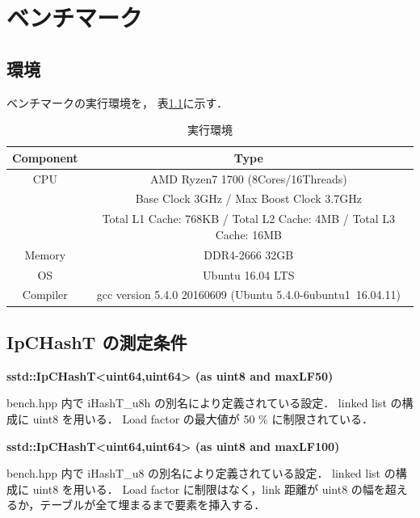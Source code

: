 \chapter{ベンチマーク}
\label{chap_Results}

\section{環境}

ベンチマークの実行環境を，
表\ref{table_env}に示す．

\begin{table}[hbtp]
  \label{table_env}
  \begin{center}
    \caption{実行環境}
    \begin{tabular}{cc} \hline
      Component & Type \rule[0pt]{0pt}{0pt} \\ \hline
      CPU & AMD Ryzen7 1700 (8Cores/16Threads) \rule[0pt]{0pt}{0pt} \\ 
      & Base Clock 3GHz / Max Boost Clock 3.7GHz \rule[0pt]{0pt}{0pt} \\
      & Total L1 Cache: 768KB / Total L2 Cache: 4MB / Total L3 Cache: 16MB \\
      Memory & DDR4-2666 32GB \rule[0pt]{0pt}{0pt} \\
      OS & Ubuntu 16.04 LTS \rule[0pt]{0pt}{0pt} \\
      Compiler & gcc version 5.4.0 20160609 (Ubuntu 5.4.0-6ubuntu1~16.04.11) \rule[0pt]{0pt}{0pt} \\ \hline
    \end{tabular}
  \end{center}
\end{table}


\section{IpCHashT の測定条件}

{\bf sstd::IpCHashT<uint64,uint64> (as uint8 and maxLF50)}

{\rm bench.hpp} 内で {\rm iHashT\_u8h} の別名により定義されている設定．
linked list の構成に uint8 を用いる．
Load factor の最大値が 50 \% に制限されている．
\leavevmode \newline

{\bf sstd::IpCHashT<uint64,uint64> (as uint8 and maxLF100)}

{\rm bench.hpp} 内で {\rm iHashT\_u8} の別名により定義されている設定．
linked list の構成に uint8 を用いる．
Load factor に制限はなく，link 距離が uint8 の幅を超えるか，テーブルが全て埋まるまで要素を挿入する．
\leavevmode \newline


